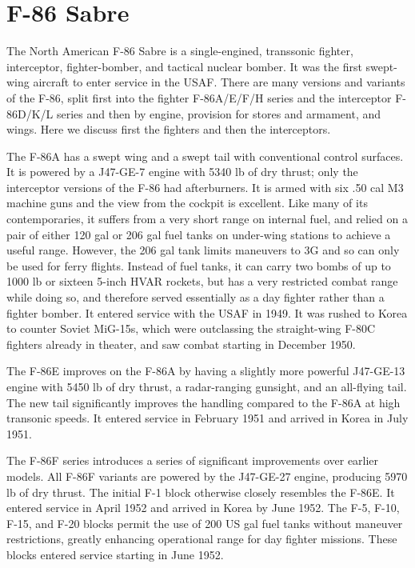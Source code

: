 \section*{F-86 Sabre}

The North American F-86 Sabre is a single-engined, transsonic fighter, interceptor, fighter-bomber, and tactical nuclear bomber. It was the first swept-wing aircraft to enter service in the USAF. There are many versions and variants of the F-86, split first into the fighter F-86A/E/F/H series and the interceptor F-86D/K/L series and then by engine, provision for stores and armament, and wings. Here we discuss first the fighters and then the interceptors.

The F-86A has a swept wing and a swept tail with conventional control surfaces. It is powered by a J47-GE-7 engine with 5340 lb of dry thrust; only the interceptor versions of the F-86 had afterburners. It is armed with six .50 cal M3 machine guns and the view from the cockpit is excellent. Like many of its contemporaries, it suffers from a very short range on internal fuel, and relied on a pair of either 120 gal or 206 gal fuel tanks on under-wing stations to achieve a useful range. However, the 206 gal tank limits maneuvers to 3G and so can only be used for ferry flights. Instead of fuel tanks, it can carry two bombs of up to 1000 lb or sixteen 5-inch HVAR rockets, but has a very restricted combat range while doing so, and therefore served essentially as a day fighter rather than a fighter bomber. It entered service with the USAF in 1949. It was rushed to Korea to counter Soviet MiG-15s, which were outclassing the straight-wing F-80C fighters already in theater, and saw combat starting in December 1950.

The F-86E improves on the F-86A by having a slightly more powerful J47-GE-13 engine with 5450 lb of dry thrust, a radar-ranging gunsight, and an all-flying tail. The new tail significantly improves the handling compared to the F-86A at high transonic speeds. It entered service in February 1951 and arrived in Korea in July 1951.

The F-86F series introduces a series of significant improvements over earlier models. All F-86F variants are powered by the J47-GE-27 engine, producing 5970 lb of dry thrust. The initial F-1 block otherwise closely resembles the F-86E. It entered service in April 1952 and arrived in Korea by June 1952. The F-5, F-10, F-15, and F-20 blocks permit the use of 200 US gal fuel tanks without maneuver restrictions, greatly enhancing operational range for day fighter missions. These blocks entered service starting in June 1952.

